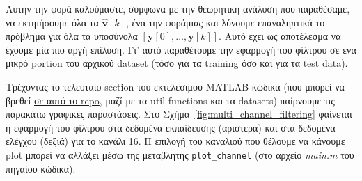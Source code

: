 \documentclass[12pt]{article} %
\begin{document}
Αυτήν την φορά καλούμαστε, σύμφωνα με την θεωρητική ανάλυση που παραθέσαμε, να εκτιμήσουμε όλα τα $\hat{\mathbf{v}}[k]$, ένα την φορά\textemdash μιας και λύνουμε επαναληπτικά το πρόβλημα για όλα τα υποσύνολα $[\mathbf{y}[0], \ldots, \mathbf{y}[k]]$. Αυτό έχει ως αποτέλεσμα να έχουμε μία πιο αργή επίλυση. Γι' αυτό παραθέτουμε την εφαρμογή του φίλτρου σε ένα μικρό portion του αρχικού dataset (τόσο για τα training όσο και για τα test data). 



Τρέχοντας το τελευταίο section του εκτελέσιμου MATLAB κώδικα (που μπορεί να βρεθεί \href{https://github.com/georrous6/Estimation-and-Detection-Theory/tree/main/PartB/src}{σε αυτό το repo}, μαζί με τα util functions και τα datasets) παίρνουμε τις παρακάτω γραφικές παραστάσεις. 
Στο Σχήμα~\ref{fig:multi_channel_filtering} φαίνεται η εφαρμογή του φίλτρου στα δεδομένα εκπαίδευσης 
(αριστερά) και στα δεδομένα ελέγχου (δεξιά) για το κανάλι 16. 
Η επιλογή του καναλιού που θέλουμε να κάνουμε plot μπορεί να αλλάξει μέσω της μεταβλητής \texttt{plot\_channel}
(στο αρχείο \textit{main.m} του πηγαίου κώδικα). 
\end{document}
